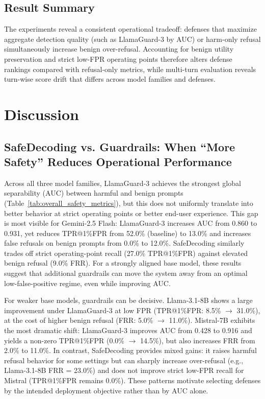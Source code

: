 \documentclass[10pt, twocolumn]{article}
\begin{document}
\subsection{Result Summary}
\label{sec:results_summary}

The experiments reveal a consistent operational tradeoff: defenses that maximize aggregate detection quality (such as LlamaGuard-3 by AUC) or harm-only refusal simultaneously increase benign over-refusal. Accounting for benign utility preservation and strict low-FPR operating points therefore alters defense rankings compared with refusal-only metrics, while multi-turn evaluation reveals turn-wise score drift that differs across model families and defenses.

\section{Discussion}
\label{sec:discussion}

\subsection{SafeDecoding vs. Guardrails: When ``More Safety'' Reduces Operational Performance}

Across all three model families, LlamaGuard-3 achieves the strongest global separability (AUC) between harmful and benign prompts (Table~\ref{tab:overall_safety_metrics}), but this does not uniformly translate into better behavior at strict operating points or better end-user experience. This gap is most visible for Gemini-2.5 Flash: LlamaGuard-3 increases AUC from 0.860 to 0.931, yet reduces TPR@1\%FPR from 52.0\% (baseline) to 13.0\% and increases false refusals on benign prompts from 0.0\% to 12.0\%. SafeDecoding similarly trades off strict operating-point recall (27.0\% TPR@1\%FPR) against elevated benign refusal (9.0\% FRR). For a strongly aligned base model, these results suggest that additional guardrails can move the system away from an optimal low-false-positive regime, even while improving AUC.

For weaker base models, guardrails can be decisive. Llama-3.1-8B shows a large improvement under LlamaGuard-3 at low FPR (TPR@1\%FPR: 8.5\% $\rightarrow$ 31.0\%), at the cost of higher benign refusal (FRR: 5.0\% $\rightarrow$ 11.0\%). Mistral-7B exhibits the most dramatic shift: LlamaGuard-3 improves AUC from 0.428 to 0.916 and yields a non-zero TPR@1\%FPR (0.0\% $\rightarrow$ 14.5\%), but also increases FRR from 2.0\% to 11.0\%. In contrast, SafeDecoding provides mixed gains: it raises harmful refusal behavior for some settings but can sharply increase over-refusal (e.g., Llama-3.1-8B FRR = 23.0\%) and does not improve strict low-FPR recall for Mistral (TPR@1\%FPR remains 0.0\%). These patterns motivate selecting defenses by the intended deployment objective rather than by AUC alone.
\end{document}
